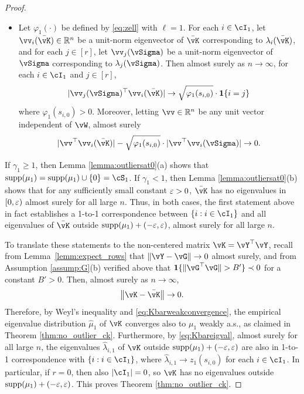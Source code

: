 \begin{proof}
\begin{itemize}
\item Let $\varphi_1(\cdot)$ be defined by \eqref{eq:zell} with $\ell=1$.
For each $i \in \cI_1$, let $\vv_i(\bar\vK) \in \R^n$
be a unit-norm eigenvector of $\bar\vK$
corresponding to $\lambda_i(\bar\vK)$, and for each $j \in [r]$,
let $\vv_j(\vSigma)$ be a unit-norm eigenvector of $\vSigma$
corresponding to $\lambda_j(\vSigma)$. Then
almost surely as $n \to \infty$, for each $i \in \cI_1$ and $j \in [r]$,
\begin{equation}\label{eq:Kbareigvec1}
|\vv_j(\vSigma)^\top \vv_i(\bar\vK)| \to \sqrt{\varphi_1(s_{i,0})} \cdot \bI\{i=j\}
\end{equation}
where $\varphi_1(s_{i,0})>0$. Moreover,
letting $\vv\in\R^n$ be any unit vector independent of $\vW$, almost surely
\begin{equation}\label{eq:Kbareigvec2}
|\vv^\top \vv_i(\bar\vK)|-\sqrt{\varphi_1(s_{i,0})}
\cdot|\vv^\top\vv_i(\vSigma)| \to 0.
\end{equation}
\end{itemize}

If $\gamma_1 \geq 1$, then Lemma \ref{lemma:outliersat0}(a) shows that
$\supp{\mu_1}=\supp{\mu_1} \cup \{0\}=\cS_1$. If $\gamma_1<1$, then
Lemma \ref{lemma:outliersat0}(b) shows that for any sufficiently small constant
$\varepsilon>0$, $\bar\vK$ has no eigenvalues in $[0,\varepsilon)$ almost surely
for all large $n$. Thus, in both cases, the first statement above in fact
establishes a 1-to-1 correspondence between $\{i:i \in \cI_1\}$ and
all eigenvalues of $\bar\vK$ outside $\mathrm{supp}({\mu_1})+(-\varepsilon,\varepsilon)$, almost surely
for all large $n$.

To translate these statements to the non-centered matrix
$\vK=\vY^\top\vY$, recall from Lemma~\ref{lemm:expect_rows} that $\|\vY-\vG\|
\to 0$ almost surely, and from Assumption \ref{assump:G}(b) verified above that 
$\bI\{\|\vG^\top \vG\|>B'\} \prec 0$ for a constant $B'>0$.
Then, almost surely as $n \to \infty$,
	\[\norm{\vK-\bar\vK} \to 0.\]
Therefore, by Weyl's inequality and \eqref{eq:Kbarweakconvergence}, the
empirical eigenvalue distribution $\widehat \mu_1$ of $\vK$ converges also to
$\mu_1$ weakly a.s., as claimed in Theorem \ref{thm:no_outlier_ck}.
Furthermore, by \eqref{eq:Kbareigval}, almost surely for all
large $n$, the eigenvalues $\widehat\lambda_{i,1}$ of $\vK$ outside
$\mathrm{supp}({\mu_1})+(-\varepsilon,\varepsilon)$ are also in 1-to-1
correspondence with $\{i:i \in \cI_1\}$, where
$\widehat\lambda_{i,1} \to z_1(s_{i,0})$ for each $i \in \cI_1$. In particular,
if $r=0$, then also $|\cI_1|=0$, so $\vK$ has no eigenvalues outside
$\mathrm{supp}({\mu_1})+(-\varepsilon,\varepsilon)$. This proves Theorem \ref{thm:no_outlier_ck}.


\end{proof}
